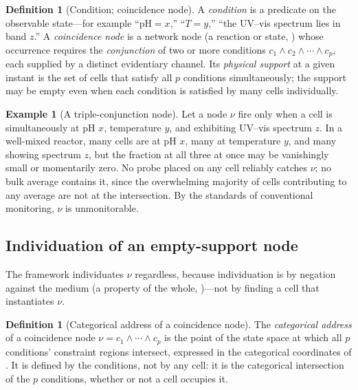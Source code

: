 \documentclass[11pt,twocolumn,a4paper]{article}
\theoremstyle{thmstyle}
\theoremstyle{definition}
\newtheorem{definition}[theorem]{Definition}
\newtheorem{example}[theorem]{Example}
\theoremstyle{remark}
\begin{document}
\begin{definition}[Condition; coincidence node]
\label{def:coincidence}
A \emph{condition} is a predicate on the observable state---for example
``$\mathrm{pH}=x$,'' ``$T=y$,'' ``the UV--vis spectrum lies in band $z$.''
A \emph{coincidence node} is a network node (a reaction or state,
) whose occurrence requires the \emph{conjunction} of two
or more conditions $c_1\wedge c_2\wedge\cdots\wedge c_p$, each supplied by a
distinct evidentiary channel. Its \emph{physical support} at a given instant
is the set of cells that satisfy all $p$ conditions simultaneously; the
support may be empty even when each condition is satisfied by many cells
individually.
\end{definition}

\begin{example}[A triple-conjunction node]
\label{ex:triple}
Let a node $\nu$ fire only when a cell is simultaneously at pH $x$,
temperature $y$, and exhibiting UV--vis spectrum $z$. In a well-mixed
reactor, many cells are at pH $x$, many at temperature $y$, and many showing
spectrum $z$, but the fraction at all three at once may be vanishingly small
or momentarily zero. No probe placed on any cell reliably catches $\nu$; no
bulk average contains it, since the overwhelming majority of cells
contributing to any average are not at the intersection. By the standards of
conventional monitoring, $\nu$ is unmonitorable.
\end{example}

\subsection{Individuation of an empty-support node}

The framework individuates $\nu$ regardless, because individuation is by
negation against the medium (a property of the whole,
)---not by finding a cell that instantiates $\nu$.

\begin{definition}[Categorical address of a coincidence node]
\label{def:coincidence-address}
The \emph{categorical address} of a coincidence node $\nu=c_1\wedge\cdots
\wedge c_p$ is the point of the state space at which all $p$ conditions'
constraint regions intersect, expressed in the categorical coordinates of
. It is defined by the conditions, not by any cell: it is
the categorical intersection of the $p$ conditions, whether or not a cell
occupies it.
\end{definition}
\end{document}
